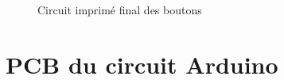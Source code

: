 \begin{figure}[!htbp]
\begin{subfigure}[m]{.31\linewidth}
    \end{subfigure}
    \hfill
    \begin{subfigure}[m]{.31\linewidth}
        \centering
    \end{subfigure}
    \caption{Circuit imprimé final des boutons}
\end{figure}

\FloatBarrier

\section{PCB du circuit Arduino}

